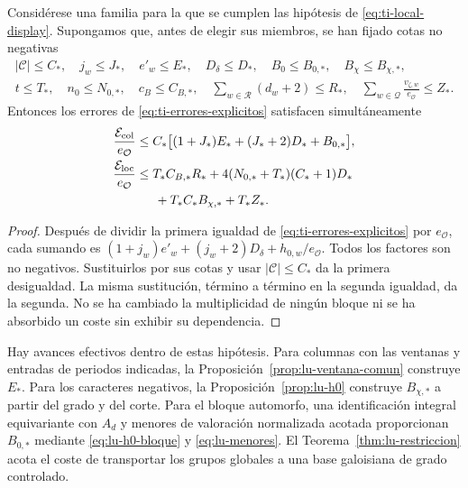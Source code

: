 \begin{proposicion}
\label{prop:lu-presupuesto}
Considérese una familia para la que se cumplen las hipótesis de
\eqref{eq:ti-local-display}. Supongamos que, antes de elegir
sus miembros, se han fijado cotas no negativas
\begin{equation}
\begin{gathered}
 |\mathcal C|\le C_*,\quad j_w\le J_*,\quad e'_w\le E_*,\quad
 D_\delta\le D_*,\quad B_0\le B_{0,*},\quad B_\chi\le B_{\chi,*},\\
 t\le T_*,\quad n_0\le N_{0,*},\quad c_B\le C_{B,*},\quad
 \sum_{w\in\mathcal R}(d_w+2)\le R_*,\quad
 \sum_{w\in\mathcal Q}\frac{v_{\zeta,w}}{e_{\mathcal O}}\le Z_*.
\end{gathered}
\label{eq:lu-datos-uniformes}
\end{equation}
Entonces los errores de \eqref{eq:ti-errores-explicitos}
satisfacen simultáneamente
\begin{equation}
\begin{aligned}
 \frac{\mathcal E_{\rm col}}{e_{\mathcal O}}
  &\le C_*\bigl[(1+J_*)E_*+(J_*+2)D_*+B_{0,*}\bigr],\\
 \frac{\mathcal E_{\rm loc}}{e_{\mathcal O}}
  &\le T_*C_{B,*}R_*+4(N_{0,*}+T_*)(C_*+1)D_*\\
  &\hspace{1.5em}+T_*C_*B_{\chi,*}+T_*Z_*.
\end{aligned}
\label{eq:lu-presupuesto-uniforme}
\end{equation}
\end{proposicion}
\begin{proof}
Después de dividir la primera igualdad de
\eqref{eq:ti-errores-explicitos} por $e_{\mathcal O}$, cada
sumando es
$(1+j_w)e'_w+(j_w+2)D_\delta+h_{0,w}/e_{\mathcal O}$.
Todos los factores son no negativos. Sustituirlos por sus cotas
y usar $|\mathcal C|\le C_*$ da la primera desigualdad.
La misma sustitución, término a término en la segunda igualdad,
da la segunda. No se ha cambiado la multiplicidad de ningún
bloque ni se ha absorbido un coste sin exhibir su dependencia.
\end{proof}

Hay avances efectivos dentro de estas hipótesis. Para columnas
con las ventanas y entradas de periodos indicadas, la
Proposición~\ref{prop:lu-ventana-comun} construye $E_*$.
Para los caracteres negativos, la
Proposición~\ref{prop:lu-h0} construye $B_{\chi,*}$ a partir
del grado y del corte. Para el bloque automorfo, una
identificación integral equivariante con $A_d$ y menores de
valoración normalizada acotada proporcionan $B_{0,*}$ mediante
\eqref{eq:lu-h0-bloque} y \eqref{eq:lu-menores}.
El Teorema~\ref{thm:lu-restriccion} acota el coste de transportar
los grupos globales a una base galoisiana de grado controlado.

